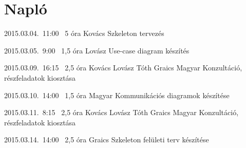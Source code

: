 %
\pagebreak
\section{Napló}

\begin{naplo}

\bejegyzes
{2015.03.04.~11:00~}
{5 óra}
{Kovács}
{Szkeleton tervezés}

\bejegyzes
{2015.03.05.~9:00~}
{1,5 óra}
{Lovász}
{Use-case diagram készítés}

\bejegyzes
{2015.03.09.~16:15~} %
{2,5 óra} %
{Kovács\newline
Lovász\newline
Tóth\newline
Graics\newline
Magyar
} %
{Konzultáció, részfeladatok kiosztása}

\bejegyzes
{2015.03.10.~14:00~}
{1,5 óra}
{Magyar}
{Kommunikációs diagramok készítése}

\bejegyzes
{2015.03.11.~8:15~} %
{2,5 óra} %
{Kovács\newline
Lovász\newline
Tóth\newline
Graics\newline
Magyar
} %
{Konzultáció, részfeladatok kiosztása}

\bejegyzes
{2015.03.14.~14:00~}
{2,5 óra}
{Graics}
{Szkeleton felületi terv készítése}

\end{naplo}

